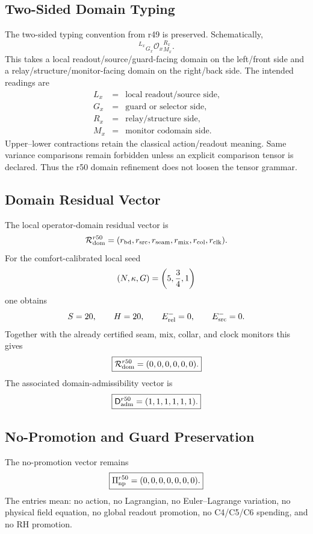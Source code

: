 \subsection{Two-Sided Domain Typing}
\label{subsec:r50-two-sided-domain-typing}

The two-sided typing convention from r49 is preserved.  Schematically,
\[
{}^{L_x}{}_{G_x}\mathcal O_x{}^{R_x}_{M_x}.
\]
This takes a local readout/source/guard-facing domain on the left/front side and a
relay/structure/monitor-facing domain on the right/back side.  The intended
readings are
\[
\begin{array}{lll}
L_x&=&\text{local readout/source side},\\
G_x&=&\text{guard or selector side},\\
R_x&=&\text{relay/structure side},\\
M_x&=&\text{monitor codomain side}.
\end{array}
\]
Upper--lower contractions retain the classical action/readout meaning.  Same
variance comparisons remain forbidden unless an explicit comparison tensor is
declared.  Thus the r50 domain refinement does not loosen the tensor grammar.

\subsection{Domain Residual Vector}
\label{subsec:r50-domain-residual-vector}

The local operator-domain residual vector is
\[
\mathcal R_{\rm dom}^{r50}
=
(r_{\rm bd},r_{\rm src},r_{\rm seam},r_{\rm mix},r_{\rm col},r_{\rm clk}).
\]
For the comfort-calibrated local seed
\[
(N,\kappa,G)=\left(5,{3\over4},1\right)
\]
one obtains
\[
S=20,
\qquad
H=20,
\qquad
E_{\rm rel}^{-}=0,
\qquad
E_{\rm src}^{-}=0.
\]
Together with the already certified seam, mix, collar, and clock monitors this
gives
\[
\boxed{
\mathcal R_{\rm dom}^{r50}=(0,0,0,0,0,0).
}
\]
The associated domain-admissibility vector is
\[
\boxed{
\mathsf D_{\rm adm}^{r50}=(1,1,1,1,1,1).
}
\]

\subsection{No-Promotion and Guard Preservation}
\label{subsec:r50-no-promotion-guard}

The no-promotion vector remains
\[
\boxed{
\Pi_{\rm np}^{r50}=(0,0,0,0,0,0,0).
}
\]
The entries mean: no action, no Lagrangian, no Euler--Lagrange variation, no
physical field equation, no global readout promotion, no C4/C5/C6 spending, and
no RH promotion.

